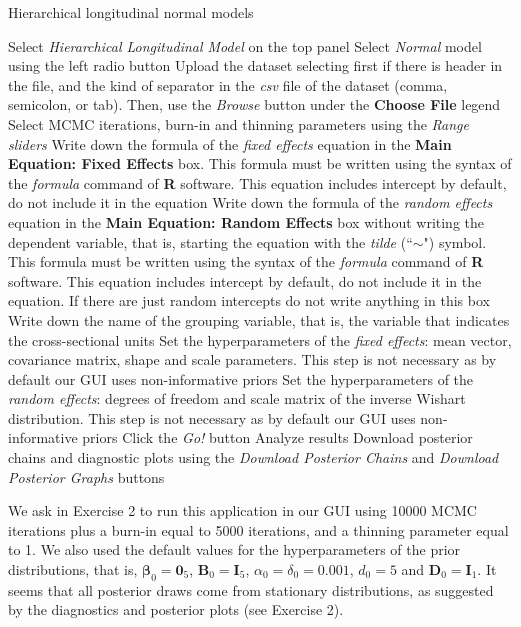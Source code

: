 \begin{algorithm}[h!]
	\caption{Hierarchical longitudinal normal models}\label{alg:HLN}
	\begin{algorithmic}[1]  		 			
		\State Select \textit{Hierarchical Longitudinal Model} on the top panel
		\State Select \textit{Normal} model using the left radio button
		\State Upload the dataset selecting first if there is header in the file, and the kind of separator in the \textit{csv} file of the dataset (comma, semicolon, or tab). Then, use the \textit{Browse} button under the \textbf{Choose File} legend
		\State Select MCMC iterations, burn-in and thinning parameters using the \textit{Range sliders}
		\State Write down the formula of the \textit{fixed effects} equation in the \textbf{Main Equation: Fixed Effects} box. This formula must be written using the syntax of the \textit{formula} command of \textbf{R} software. This equation includes intercept by default, do not include it in the equation
		\State Write down the formula of the \textit{random effects} equation in the \textbf{Main Equation: Random Effects} box without writing the dependent variable, that is, starting the equation with the \textit{tilde} (``$\sim$") symbol. This formula must be written using the syntax of the \textit{formula} command of \textbf{R} software. This equation includes intercept by default, do not include it in the equation. If there are just random intercepts do not write anything in this box
		\State Write down the name of the grouping variable, that is, the variable that indicates the cross-sectional units 
		\State Set the hyperparameters of the \textit{fixed effects}: mean vector, covariance matrix, shape and scale parameters. This step is not necessary as by default our GUI uses non-informative priors
		\State Set the hyperparameters of the \textit{random effects}: degrees of freedom and scale matrix of the inverse Wishart distribution. This step is not necessary as by default our GUI uses non-informative priors
		\State Click the \textit{Go!} button
		\State Analyze results
		\State Download posterior chains and diagnostic plots using the \textit{Download Posterior Chains} and \textit{Download Posterior Graphs} buttons
	\end{algorithmic} 
\end{algorithm}

We ask in Exercise 2 to run this application in our GUI using 10000 MCMC iterations plus a burn-in equal to 5000 iterations, and a thinning parameter equal to 1. We also used the default values for the hyperparameters of the prior distributions, that is, $\bm{\beta}_0=\bm{0}_5$, $\bm{B}_0=\bm{I}_5$, $\alpha_0=\delta_0=0.001$, $d_0=5$ and $\bm{D}_0=\bm{I}_1$. It seems that all posterior draws come from stationary distributions, as suggested by the diagnostics and posterior plots (see Exercise 2).

